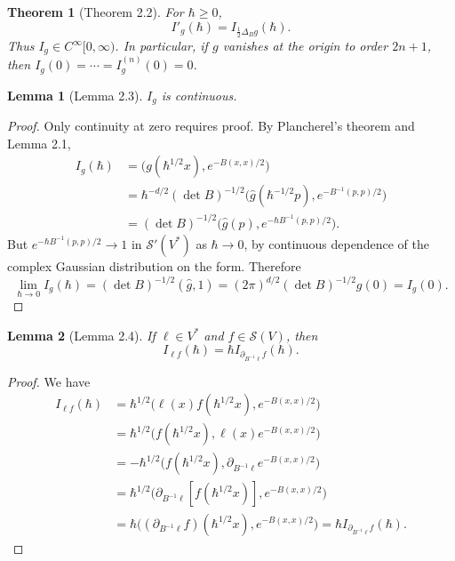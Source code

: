 \documentclass[UTF8,11pt,a4paper]{ctexart}
\newtheorem*{theorem}{Theorem}
\newtheorem*{lemma}{Lemma}
\theoremstyle{definition}\newtheorem*{definition}{Definition}
\theoremstyle{remark}\newtheorem*{remark}{Remark}
\begin{document}
\begin{theorem}[Theorem 2.2]
For $\hbar\ge0$,
\[
I'_g(\hbar)=I_{\frac12\Delta_Bg}(\hbar).
\]
Thus $I_g\in C^\infty[0,\infty)$. In particular, if $g$ vanishes at the origin to order $2n+1$, then $I_g(0)=\cdots=I_g^{(n)}(0)=0$.
\end{theorem}

\begin{lemma}[Lemma 2.3]
$I_g$ is continuous.
\end{lemma}
\begin{proof}
Only continuity at zero requires proof. By Plancherel's theorem and Lemma 2.1,
\[
\begin{aligned}
I_g(\hbar)
&=\bigl(g(\hbar^{1/2}x),e^{-B(x,x)/2}\bigr)\\
&=\hbar^{-d/2}(\det B)^{-1/2}
\bigl(\widehat g(\hbar^{-1/2}p),e^{-B^{-1}(p,p)/2}\bigr)\\
&=(\det B)^{-1/2}\bigl(\widehat g(p),e^{-\hbar B^{-1}(p,p)/2}\bigr).
\end{aligned}
\]
But $e^{-\hbar B^{-1}(p,p)/2}\to1$ in $\mathcal S'(V^*)$ as $\hbar\to0$, by continuous dependence of the complex Gaussian distribution on the form. Therefore
\[
\lim_{\hbar\to0}I_g(\hbar)
=(\det B)^{-1/2}(\widehat g,1)
=(2\pi)^{d/2}(\det B)^{-1/2}g(0)=I_g(0).
\]
\end{proof}

\begin{lemma}[Lemma 2.4]
If $\ell\in V^*$ and $f\in\mathcal S(V)$, then
\[
I_{\ell f}(\hbar)=\hbar I_{\partial_{B^{-1}\ell}f}(\hbar).
\]
\end{lemma}
\begin{proof}
We have
\[
\begin{aligned}
I_{\ell f}(\hbar)
&=\hbar^{1/2}\bigl(\ell(x)f(\hbar^{1/2}x),e^{-B(x,x)/2}\bigr)\\
&=\hbar^{1/2}\bigl(f(\hbar^{1/2}x),\ell(x)e^{-B(x,x)/2}\bigr)\\
&=-\hbar^{1/2}\bigl(f(\hbar^{1/2}x),\partial_{B^{-1}\ell}e^{-B(x,x)/2}\bigr)\\
&=\hbar^{1/2}\bigl(\partial_{B^{-1}\ell}[f(\hbar^{1/2}x)],e^{-B(x,x)/2}\bigr)\\
&=\hbar\bigl((\partial_{B^{-1}\ell}f)(\hbar^{1/2}x),e^{-B(x,x)/2}\bigr)
=\hbar I_{\partial_{B^{-1}\ell}f}(\hbar).
\end{aligned}
\]
\end{proof}
\end{document}
